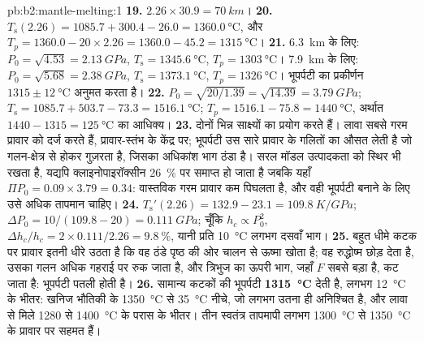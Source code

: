 \begin{solution}{pb:b2:mantle-melting:1}
\textbf{19.} $2.26\times30.9 = \qty{70}{km}$।
\textbf{20.} $T_{\mathrm s}(2.26) = 1085.7 + 300.4 - 26.0 = \qty{1360.0}{\celsius}$,
और $T_p = 1360.0 - 20\times2.26 = 1360.0 - 45.2 = \qty{1315}{\celsius}$।
\textbf{21.} \qty{6.3}{km} के लिए: $P_0 = \sqrt{4.53} = \qty{2.13}{GPa}$, $T_{\mathrm s}
= \qty{1345.6}{\celsius}$, $T_p = \qty{1303}{\celsius}$। \qty{7.9}{km} के लिए: $P_0 =
\sqrt{5.68} = \qty{2.38}{GPa}$, $T_{\mathrm s} = \qty{1373.1}{\celsius}$, $T_p =
\qty{1326}{\celsius}$। भूपर्पटी का प्रकीर्णन $1315 \pm
\qty{12}{\celsius}$ अनुमत करता है।
\textbf{22.} $P_0 = \sqrt{20/1.39} = \sqrt{14.39} = \qty{3.79}{GPa}$; $T_{\mathrm s} =
1085.7 + 503.7 - 73.3 = \qty{1516.1}{\celsius}$; $T_p = 1516.1 - 75.8 =
\qty{1440}{\celsius}$, अर्थात $1440 - 1315 = \qty{125}{\celsius}$ का आधिक्य।
\textbf{23.} दोनों भिन्न साक्ष्यों का प्रयोग करते हैं। लावा सबसे गरम प्रावार को दर्ज करते हैं,
प्रावार-स्तंभ के केंद्र पर; भूपर्पटी उस सारे प्रावार के गलितों का औसत लेती है जो
गलन-क्षेत्र से होकर गुज़रता है, जिसका अधिकांश भाग ठंडा है। सरल मॉडल
उत्पादकता को स्थिर भी रखता है, यद्यपि क्लाइनोपाइरॉक्सीन \qty{26}{\percent} पर समाप्त हो जाता है
जबकि यहाँ $\Pi P_0 = 0.09\times3.79 = 0.34$: वास्तविक गरम प्रावार कम पिघलता है, और
वही भूपर्पटी बनाने के लिए उसे अधिक तापमान चाहिए।
\textbf{24.} $T_{\mathrm s}'(2.26) = 132.9 - 23.1 = \qty{109.8}{K/GPa}$; $\Delta P_0 =
10/(109.8 - 20) = \qty{0.111}{GPa}$; चूँकि $h_c \propto P_0^2$, $\Delta h_c/h_c =
2\times0.111/2.26 = \qty{9.8}{\percent}$, यानी प्रति \qty{10}{\celsius} लगभग दसवाँ भाग।
\textbf{25.} बहुत धीमे कटक पर प्रावार इतनी धीरे उठता है कि वह ठंडे पृष्ठ की ओर
चालन से ऊष्मा खोता है; वह रुद्धोष्म छोड़ देता है, उसका गलन अधिक गहराई पर
रुक जाता है, और त्रिभुज का ऊपरी भाग, जहाँ $F$ सबसे बड़ा है, कट जाता है: भूपर्पटी
पतली होती है।
\textbf{26.} सामान्य कटकों की भूपर्पटी 
\textbf{\qty[text-series-to-math=true]{1315}{\celsius}} देती है, लगभग
\qty{12}{\celsius} के भीतर: खनिज भौतिकी के \qty{1350}{\celsius} से \qty{35}{\celsius} नीचे,
जो लगभग उतना ही अनिश्चित है, और लावा से मिले 1280 से
\qty{1400}{\celsius} के परास के भीतर। तीन स्वतंत्र तापमापी लगभग
\qty{1300}{\celsius} से \qty{1350}{\celsius} के प्रावार पर सहमत हैं।
\end{solution}
